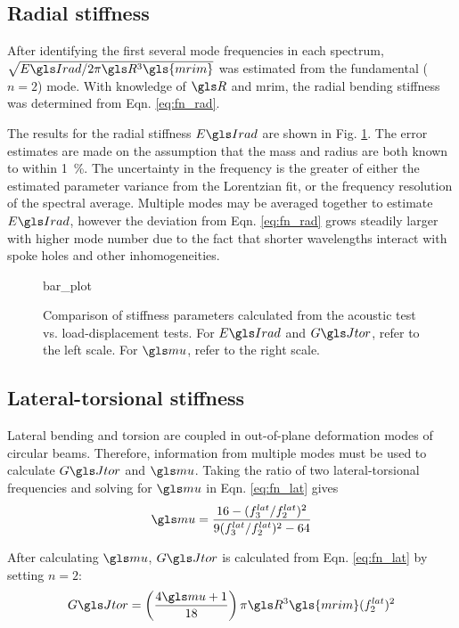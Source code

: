 \documentclass[../thesis.tex]{subfiles}
\begin{document}
\subsection{Radial stiffness}

After identifying the first several mode frequencies in each spectrum, $\sqrt{\EIr/2\pi \R^3 \gls{mrim}}$ was estimated from the fundamental ($n=2$) mode. With knowledge of $\R$ and \gls{mrim}, the radial bending stiffness was determined from Eqn. \eqref{eq:fn_rad}.

The results for the radial stiffness $\EIr$ are shown in Fig. \ref{fig:bar}. The error estimates are made on the assumption that the mass and radius are both known to within \SI{1}{\percent}. The uncertainty in the frequency is the greater of either the estimated parameter variance from the Lorentzian fit, or the frequency resolution of the spectral average. Multiple modes may be averaged together to estimate $\EIr$, however the deviation from Eqn. \eqref{eq:fn_rad} grows steadily larger with higher mode number due to the fact that shorter wavelengths interact with spoke holes and other inhomogeneities.

\begin{figure}
{bar_plot}
\caption{Comparison of stiffness parameters calculated from the acoustic test vs. load-displacement tests. For $\EIr$ and $\GJ$, refer to the left scale. For $\m$, refer to the right scale.}
\label{fig:bar}
\end{figure}

\subsection{Lateral-torsional stiffness}

Lateral bending and torsion are coupled in out-of-plane deformation modes of circular beams. Therefore, information from multiple modes must be used to calculate $\GJ$ and $\m$. Taking the ratio of two lateral-torsional frequencies and solving for $\m$ in Eqn. \eqref{eq:fn_lat} gives
\begin{equation}\label{eq:mu}
\m = \frac{16 - (f_3^{lat}/f_2^{lat})^2}{9(f_3^{lat}/f_2^{lat})^2 - 64}
\end{equation}

After calculating $\m$, $\GJ$ is calculated from Eqn. \eqref{eq:fn_lat} by setting $n=2$:
\begin{equation}\label{eq:GJ}
\GJ = \left(\frac{4\m + 1}{18} \right ) \pi \R^3 \gls{mrim} (f_2^{lat})^2
\end{equation}
\end{document}
